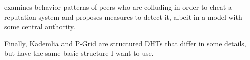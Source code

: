\documentclass[10pt]{article}
\begin{document}
\cite{li2012collusion} examines behavior patterns of peers who are colluding in
order to cheat a reputation system and proposes measures to detect it, albeit in
a model with some central authority.

Finally, Kademlia\cite{maymounkov2002kademlia} and P-Grid\cite{aberer2003p} are
structured DHTs that differ in some details, but have the same basic structure I
want to use.

{}

\end{document}
